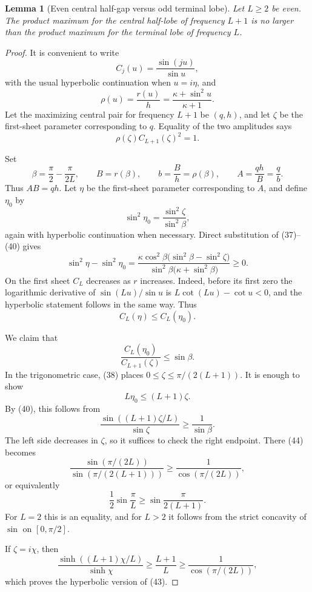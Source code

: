 \documentclass[11pt]{article}
\newtheorem{lemma}{Lemma}
\begin{document}
\begin{lemma}[Even central half-gap versus odd terminal lobe]
Let \(L\geq2\) be even. The product maximum for the central half-lobe of
frequency \(L+1\) is no larger than the product maximum for the terminal lobe
of frequency \(L\).
\end{lemma}

\begin{proof}
It is convenient to write
\[
C_j(u)=\frac{\sin(ju)}{\sin u},
\]
with the usual hyperbolic continuation when \(u=i\eta\), and
\[
\rho(u)=\frac{r(u)}h
       =\frac{\kappa+\sin^2u}{\kappa+1}.
\tag{37}
\]
Let the maximizing central pair for frequency \(L+1\) be \((q,h)\), and let
\(\zeta\) be the first-sheet parameter corresponding to \(q\). Equality of
the two amplitudes says
\[
\rho(\zeta)C_{L+1}(\zeta)^2=1.
\tag{38}
\]

Set
\[
\beta=\frac{\pi}{2}-\frac{\pi}{2L},
\qquad
B=r(\beta),
\qquad
b=\frac Bh=\rho(\beta),
\qquad
A=\frac{qh}{B}=\frac qb.
\tag{39}
\]
Thus \(AB=qh\). Let \(\eta\) be the first-sheet parameter corresponding to
\(A\), and define \(\eta_0\) by
\[
\sin^2\eta_0=\frac{\sin^2\zeta}{\sin^2\beta},
\tag{40}
\]
again with hyperbolic continuation when necessary. Direct substitution of
(37)--(40) gives
\[
\sin^2\eta-\sin^2\eta_0
 =
 \frac{\kappa\cos^2\beta
       \bigl(\sin^2\beta-\sin^2\zeta\bigr)}
      {\sin^2\beta\bigl(\kappa+\sin^2\beta\bigr)}
 \geq0.
\tag{41}
\]
On the first sheet \(C_L\) decreases as \(r\) increases. Indeed, before its
first zero the logarithmic derivative of \(\sin(Lu)/\sin u\) is
\(L\cot(Lu)-\cot u<0\), and the hyperbolic statement follows in the same way.
Thus
\[
C_L(\eta)\leq C_L(\eta_0).
\tag{42}
\]

We claim that
\[
\frac{C_L(\eta_0)}{C_{L+1}(\zeta)}
 \leq\sin\beta.
\tag{43}
\]
In the trigonometric case, (38) places
\(0\leq\zeta\leq\pi/(2(L+1))\). It is enough to show
\[
L\eta_0\leq(L+1)\zeta.
\]
By (40), this follows from
\[
\frac{\sin((L+1)\zeta/L)}{\sin\zeta}
 \geq\frac1{\sin\beta}.
\tag{44}
\]
The left side decreases in \(\zeta\), so it suffices to check the right
endpoint. There (44) becomes
\[
\frac{\sin(\pi/(2L))}{\sin(\pi/(2(L+1)))}
 \geq\frac1{\cos(\pi/(2L))},
\]
or equivalently
\[
\frac12\sin\frac{\pi}{L}
 \geq\sin\frac{\pi}{2(L+1)}.
\tag{45}
\]
For \(L=2\) this is an equality, and for \(L>2\) it follows from the strict
concavity of \(\sin\) on \([0,\pi/2]\).

If \(\zeta=i\chi\), then
\[
\frac{\sinh((L+1)\chi/L)}{\sinh\chi}
 \geq\frac{L+1}{L}
 \geq\frac1{\cos(\pi/(2L))},
\]
which proves the hyperbolic version of (43).


\end{proof}
\end{document}
